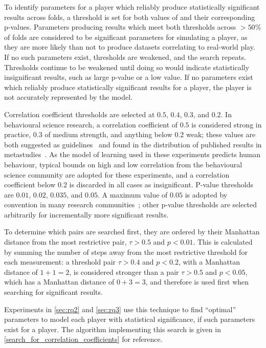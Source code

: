 To identify parameters for a player which reliably produce statistically
significant results across folds, a threshold is set for both values of \tau{}
and their corresponding p-values. Parameters producing results which meet both
thresholds across $>50\%$ of folds are considered to be significant
parameters for simulating a player, as they are more likely than not to produce
datasets correlating to real-world play. If no such parameters exist,
thresholds are weakened, and the search repeats. Thresholds continue to be
weakened until doing so would indicate statistically insignificant results, such
as large p-value or a low \tau{} value. If no parameters exist which reliably
produce statistically significant results for a player, the player is not
accurately represented by the model.

\label{statistical_significance_thresholds_justified}
Correlation coefficient thresholds are selected at $0.5$, $0.4$, $0.3$, and
$0.2$. In behavioural science research, a correlation coefficient of $0.5$ is
considered strong in practice, $0.3$ of medium strength, and anything below
$0.2$ weak; these values are both suggested as
guidelines~\cite{significant_values_for_correlation_statistics} and found in the
distribution of published results in
metastudies~\cite{interpreting_correlation_coefficient_magnitude_psychology}. As
the model of learning used in these experiments predicts human behaviour,
typical bounds on high and low correlation from the behavioural science
community are adopted for these experiments, and a correlation coefficient below
$0.2$ is discarded in all cases as insignificant. P-value thresholds are $0.01$,
$0.02$, $0.035$, and $0.05$. A maximum value of $0.05$ is adopted by convention
in many research communities~\cite{borderline-significance-statistics-medicine};
other p-value thresholds are selected arbitrarily for incrementally more significant
results.

To determine which pairs are searched first, they are ordered by their Manhattan
distance from the most restrictive pair, $\tau{} > 0.5$ and $p < 0.01$. This is
calculated by summing the number of steps away from the most restrictive
threshold for each measurement: a threshold pair $\tau{} > 0.4$ and $p < 0.2$,
with a Manhattan distance of $1 + 1 = 2$, is considered stronger than a pair
$\tau{} > 0.5$ and $p < 0.05$, which has a Manhattan distance of $0 + 3 = 3$,
and therefore is used first when searching for significant results.

Experiments in \cref{sec:rq2} and \cref{sec:rq3} use this technique to find
``optimal'' parameters to model each player with statistical significance, if
such parameters exist for a player. The algorithm implementing this search is
given in \cref{search_for_correlation_coefficients} for reference.



